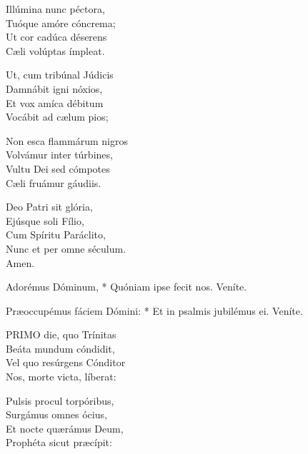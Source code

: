 Illúmina nunc péctora,\\
Tuóque amóre cóncrema;\\
Ut cor cadúca déserens\\
Cæli volúptas ímpleat.

Ut, cum tribúnal Júdicis\\
Damnábit igni nóxios,\\
Et vox amíca débitum\\
Vocábit ad cælum pios;

Non esca flammárum nigros\\
Volvámur inter túrbines,\\
Vultu Dei sed cómpotes\\
Cæli fruámur gáudiis.

Deo Patri sit glória,\\
Ejúsque soli Fílio,\\
Cum Spíritu Paráclito,\\
Nunc et per omne séculum.\\
Amen.



 Adorémus Dóminum, * Quóniam ipse fecit nos.  Veníte. \textdagger


 Præoccupémus fáciem Dómini: * Et in psalmis jubilémus ei.  Veníte. \textdagger




\lettrine[lines=2]{P}{RIMO} die, quo Trínitas\\
Beáta mundum cóndidit,\\
Vel quo resúrgens Cónditor\\
Nos, morte victa, líberat:

Pulsis procul torpóribus,\\
Surgámus omnes ócius,\\
Et nocte quærámus Deum,\\
Prophéta sicut præcípit:

